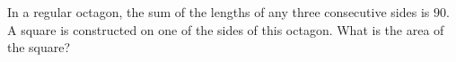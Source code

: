 In a regular octagon, the sum of the lengths of any three consecutive sides is $90$. A square is constructed on one of the sides of this octagon. What is the area of the square?
